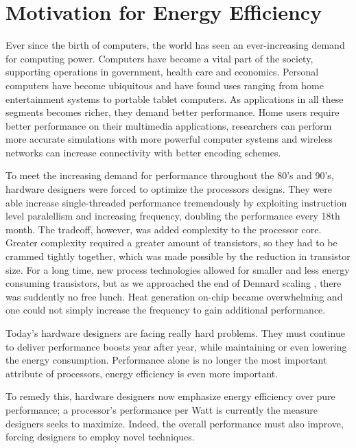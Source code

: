 \section{Motivation for Energy Efficiency}

Ever since the birth of computers, the world has seen an ever-increasing demand
for computing power. Computers have become a vital part of the society,
supporting operations in government, health care and economics. Personal
computers have become ubiquitous and have found uses ranging from home
entertainment systems to portable tablet computers. As applications in all these
segments becomes richer, they demand better performance. Home users require
better performance on their multimedia applications, researchers can perform
more accurate simulations with more powerful computer systems and wireless
networks can increase connectivity with better encoding schemes.

To meet the increasing demand for performance throughout the 80's and 90's,
hardware designers were forced to optimize the processors designs. They were
able increase single-threaded performance tremendously by exploiting instruction
level paralellism and increasing frequency, doubling the performance every 18th
month. The tradeoff, however, was added complexity to the processor core.
Greater complexity required a greater amount of transistors, so they had to be
crammed tightly together, which was made possible by the reduction in transistor
size. For a long time, new process technologies allowed for smaller and less
energy consuming transistors, but as we approached the end of Dennard scaling
\cite{dennard}, there was suddently no free lunch. Heat generation on-chip
became overwhelming and one could not simply increase the frequency to gain
additional performance.

Today's hardware designers are facing really hard problems. They must
continue to deliver performance boosts year after year, while maintaining
or even lowering the energy consumption. Performance alone is no longer the most
important attribute of processors, energy efficiency is even more important.


To remedy this, hardware designers now emphasize energy efficiency over pure
performance; a processor's performance per Watt is currently the measure
designers seeks to maximize. Indeed, the overall performance must also improve,
forcing designers to employ novel techniques.


